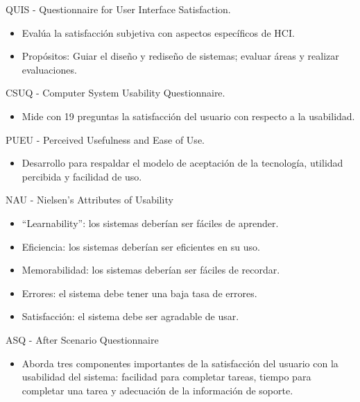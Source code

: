 \documentclass[12pt, twoside, openright]{report} %
\begin{document}
        QUIS - Questionnaire for User Interface Satisfaction.

        \begin{itemize}
        
        \item
          Evalúa la satisfacción subjetiva con aspectos específicos de
          HCI.
        \item
          Propósitos: Guiar el diseño y rediseño de sistemas; evaluar
          áreas y realizar evaluaciones.
        \end{itemize}
\pagebreak
        CSUQ - Computer System Usability Questionnaire.

        \begin{itemize}
        
        \item
          Mide con 19 preguntas la satisfacción del usuario con respecto
          a la usabilidad.
        \end{itemize}

        PUEU - Perceived Usefulness and Ease of Use.

        \begin{itemize}
        
        \item
          Desarrollo para respaldar el modelo de aceptación de la
          tecnología, utilidad percibida y facilidad de uso.
        \end{itemize}

        NAU - Nielsen's Attributes of Usability

        \begin{itemize}
        
        \item
          ``Learnability'': los sistemas deberían ser fáciles de
          aprender.
        \item
          Eficiencia: los sistemas deberían ser eficientes en su uso.
        \item
          Memorabilidad: los sistemas deberían ser fáciles de recordar.
        \item
          Errores: el sistema debe tener una baja tasa de errores.
        \item
          Satisfacción: el sistema debe ser agradable de usar.
        \end{itemize}

        ASQ - After Scenario Questionnaire

        \begin{itemize}
        
        \item
          Aborda tres componentes importantes de la satisfacción del
          usuario con la usabilidad del sistema: facilidad para
          completar tareas, tiempo para completar una tarea y adecuación
          de la información de soporte.
        \end{itemize}
\end{document}
